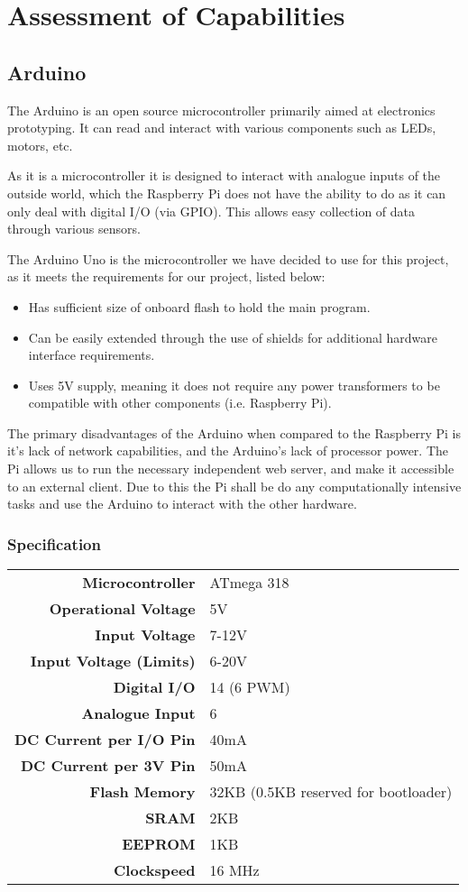 \documentclass[12pt, a4paper]{article}
\begin{document}

\section{Assessment of Capabilities}
\subsection{Arduino}
The Arduino is an open source microcontroller primarily aimed at electronics
prototyping. It can read and interact with various components such as LEDs,
motors, etc.

As it is a microcontroller it is designed to interact with analogue inputs of
the outside world, which the Raspberry Pi does not have the ability to do as it
can only deal with digital I/O (via GPIO). This allows easy collection of data
through various sensors. 

The Arduino Uno is the microcontroller we have decided to use for this project,
as it meets the requirements for our project, listed below:

\begin{itemize}
	\item Has sufficient size of onboard flash to hold the main program.
	\item Can be easily extended through the use of shields for additional hardware
	interface requirements.
	\item Uses 5V supply, meaning it does not require any power transformers to
	be compatible with other components (i.e. Raspberry Pi).
\end{itemize}

The primary disadvantages of the Arduino when compared to the Raspberry Pi is
it's lack of network capabilities, and the Arduino's lack of processor power.
The Pi allows us to run the necessary independent web server, and make it
accessible to an external client. Due to this the Pi shall be do any
computationally intensive tasks and use the Arduino to interact with the other
hardware.

\subsubsection{Specification}
\begin{tabular}{>{\bfseries}r l}
	Microcontroller & ATmega 318 \\
	Operational Voltage & 5V \\
	Input Voltage & 7-12V \\
	Input Voltage (Limits) & 6-20V \\
	Digital I/O & 14 (6 PWM) \\
	Analogue Input & 6 \\
	DC Current per I/O Pin & 40mA \\
	DC Current per 3V Pin & 50mA \\
	Flash Memory & 32KB (0.5KB reserved for bootloader) \\
	SRAM & 2KB \\
	EEPROM & 1KB \\
	Clockspeed & 16 MHz \\
\end{tabular}
\end{document}
